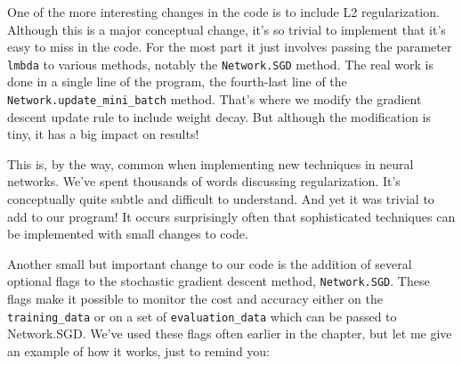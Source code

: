 One of the more interesting changes in the code is to include L2 regularization. Although this is a major conceptual change, it's so trivial to implement that it's easy to miss in the code. For the most part it just involves passing the parameter \lstinline{lmbda} to various methods, notably the \lstinline{Network.SGD} method. The real work is done in a single line of the program, the fourth-last line of the \lstinline{Network.update_mini_batch} method. That's where we modify the gradient descent update rule to include weight decay. But although the modification is tiny, it has a big impact on results!

This is, by the way, common when implementing new techniques in neural networks. We've spent thousands of words discussing regularization. It's conceptually quite subtle and difficult to understand. And yet it was trivial to add to our program! It occurs surprisingly often that sophisticated techniques can be implemented with small changes to code.

Another small but important change to our code is the addition of several optional flags to the stochastic gradient descent method, \lstinline{Network.SGD}. These flags make it possible to monitor the cost and accuracy either on the \lstinline{training_data} or on a set of \lstinline{evaluation_data} which can be passed to Network.SGD. We've used these flags often earlier in the chapter, but let me give an example of how it works, just to remind you:

